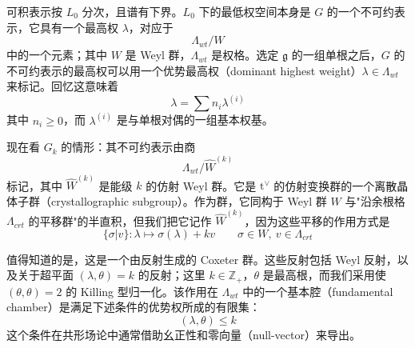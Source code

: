 可积表示按 $L_0$ 分次，且谱有下界。$L_0$ 下的最低权空间本身是 $G$ 的一个不可约表示，它具有一个最高权 $\lambda$，对应于
\begin{equation}
  \Lambda_{wt}/W
  \tag{4.148}
  \label{eq:4.148}
\end{equation}
中的一个元素；其中 $W$ 是 Weyl 群，$\Lambda_{wt}$ 是权格。选定 $\mathfrak{g}$ 的一组单根之后，$G$ 的不可约表示的最高权可以用一个优势最高权（dominant highest weight）$\lambda\in\Lambda_{wt}$ 来标记。回忆这意味着
\begin{equation}
  \lambda=\sum n_i\lambda^{(i)}
  \tag{4.149}
  \label{eq:4.149}
\end{equation}
其中 $n_i\ge0$，而 $\lambda^{(i)}$ 是与单根对偶的一组基本权基。


现在看 $G_k$ 的情形：其不可约表示由商
\begin{equation}
  \Lambda_{wt}/\widehat{W}^{(k)}
  \tag{4.150}
  \label{eq:4.150}
\end{equation}
标记，其中 $\widehat{W}^{(k)}$ 是能级 $k$ 的仿射 Weyl 群。它是 $\mathrm{t}^\vee$ 的仿射变换群的一个离散晶体子群（crystallographic subgroup）。作为群，它同构于 Weyl 群 $W$ 与"沿余根格 $\Lambda_{crt}$ 的平移群"的半直积，但我们把它记作 $\widehat{W}^{(k)}$，因为这些平移的作用方式是
\begin{equation}
  \{\sigma|v\}: \lambda\mapsto \sigma(\lambda)+kv \qquad \sigma\in W,\ v\in\Lambda_{crt}
  \tag{4.151}
  \label{eq:4.151}
\end{equation}

值得知道的是，这是一个由反射生成的 Coxeter 群。这些反射包括 Weyl 反射，以及关于超平面 $(\lambda,\theta)=k$ 的反射；这里 $k\in\mathbb{Z}_+$，$\theta$ 是最高根，而我们采用使 $(\theta,\theta)=2$ 的 Killing 型归一化。该作用在 $\Lambda_{wt}$ 中的一个基本腔（fundamental chamber）是满足下述条件的优势权所成的有限集：
\begin{equation}
  (\lambda,\theta)\le k
  \tag{4.152}
  \label{eq:4.152}
\end{equation}
这个条件在共形场论中通常借助幺正性和零向量（null-vector）来导出。

